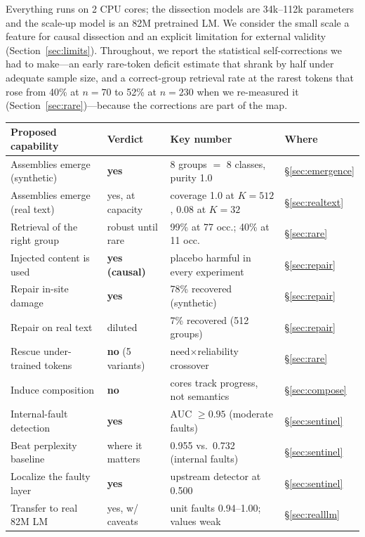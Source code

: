 \documentclass[11pt]{article}
\begin{document}
Everything runs on 2 CPU cores; the dissection models are 34k--112k parameters
and the scale-up model is an 82M pretrained LM. We consider
the small scale a feature for causal dissection and an explicit limitation for
external validity (Section~\ref{sec:limits}). Throughout, we report the
statistical self-corrections we had to make---an early rare-token deficit
estimate that shrank by half under adequate sample size, and a
correct-group retrieval rate at the rarest tokens that rose from 40\% at
$n{=}70$ to 52\% at $n{=}230$ when we re-measured it
(Section~\ref{sec:rare})---because the corrections are part of the map.

\begin{table}[t]
\centering
\small
\setlength{\tabcolsep}{4pt}
\begin{tabular}{@{}llll@{}}
\toprule
Proposed capability & Verdict & Key number & Where \\
\midrule
Assemblies emerge (synthetic) & \textbf{yes} & 8 groups $=$ 8 classes, purity 1.0 & \S\ref{sec:emergence} \\
Assemblies emerge (real text) & yes, at capacity & coverage 1.0 at $K{=}512$, 0.08 at $K{=}32$ & \S\ref{sec:realtext} \\
Retrieval of the right group & robust until rare & 99\% at 77 occ.; 40\% at 11 occ. & \S\ref{sec:rare} \\
Injected content is used & \textbf{yes (causal)} & placebo harmful in every experiment & \S\ref{sec:repair} \\
Repair in-site damage & \textbf{yes} & 78\% recovered (synthetic) & \S\ref{sec:repair} \\
Repair on real text & diluted & 7\% recovered (512 groups) & \S\ref{sec:repair} \\
Rescue under-trained tokens & \textbf{no} (5 variants) & need$\times$reliability crossover & \S\ref{sec:rare} \\
Induce composition & \textbf{no} & cores track progress, not semantics & \S\ref{sec:compose} \\
Internal-fault detection & \textbf{yes} & AUC $\ge 0.95$ (moderate faults) & \S\ref{sec:sentinel} \\
Beat perplexity baseline & where it matters & 0.955 vs.\ 0.732 (internal faults) & \S\ref{sec:sentinel} \\
Localize the faulty layer & \textbf{yes} & upstream detector at 0.500 & \S\ref{sec:sentinel} \\
\midrule
Transfer to real 82M LM & yes, w/ caveats & unit faults 0.94--1.00; values weak & \S\ref{sec:realllm} \\

\end{tabular}
\end{table}
\end{document}
